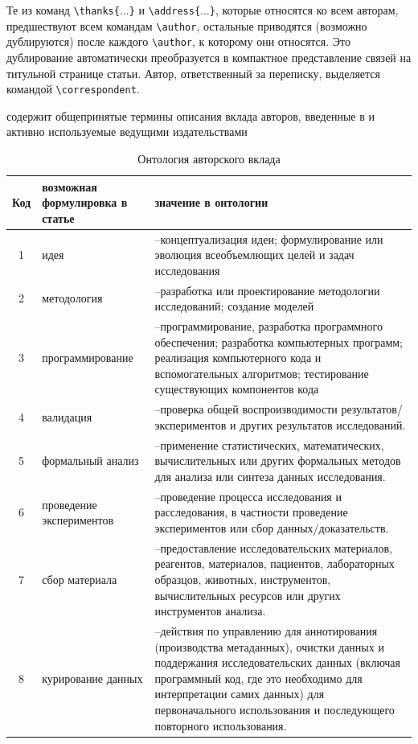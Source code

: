 \documentclass{psta}%
\begin{document}
Те из команд \verb|\thanks{|...\verb|}| и \verb|\address{|...\verb|}|, которые относятся ко всем авторам, предшествуют всем командам \verb|\author|,
остальные приводятся (возможно дублируются) после каждого \verb|\author|, к которому они относятся.
Это дублирование автоматически преобразуется в компактное представление связей на титульной странице статьи.
Автор, ответственный за переписку, выделяется командой \verb|\correspondent|.

 содержит общепринятые термины описания вклада
авторов, введенные в \cite{CRediT} и активно используемые ведущими издательствами
\linebreak \begin{landscape} %
\begin{table}\footnotesize
\caption{Онтология авторского вклада}\label{tab:CRediT}
\renewcommand{\arraystretch}{1.0}
\begin{tabular}{|c|>{\raggedright}m{3cm}<{\baselineskip7pt}|m{115mm}<{\baselineskip7pt}|}
\hline
Код & возможная формулировка в статье\centering & значение в онтологии\centering\arraybackslash\\
\hline
1 & идея &\---концептуализация идеи; формулирование или эволюция всеобъемлющих целей и задач исследования\\
2 & методология &\---разработка или проектирование методологии исследований; создание моделей\\
3 & программирование &\---программирование, разработка программного обеспечения; разработка компьютерных программ; реализация компьютерного кода и вспомогательных алгоритмов; тестирование существующих компонентов кода\\
4 & валидация &\---проверка общей воспроизводимости результатов/экспериментов и других результатов исследований.\\
5 & формальный анализ &\---применение статистических, математических, вычислительных или других формальных методов для анализа или синтеза данных исследования.\\
6 & проведение экспериментов &\---проведение процесса исследования и расследования, в частности проведение экспериментов или сбор данных/доказательств.\\
7 & сбор материала &\---предоставление исследовательских материалов, реагентов, материалов, пациентов, лабораторных образцов, животных, инструментов, вычислительных ресурсов или других инструментов анализа.\\
8 & курирование данных &\---действия по управлению для аннотирования (производства метаданных), очистки данных и поддержания исследовательских данных (включая программный код, где это необходимо для интерпретации самих данных) для первоначального использования и последующего повторного использования.\\

\end{tabular}
\end{table}
\end{landscape}
\end{document}

